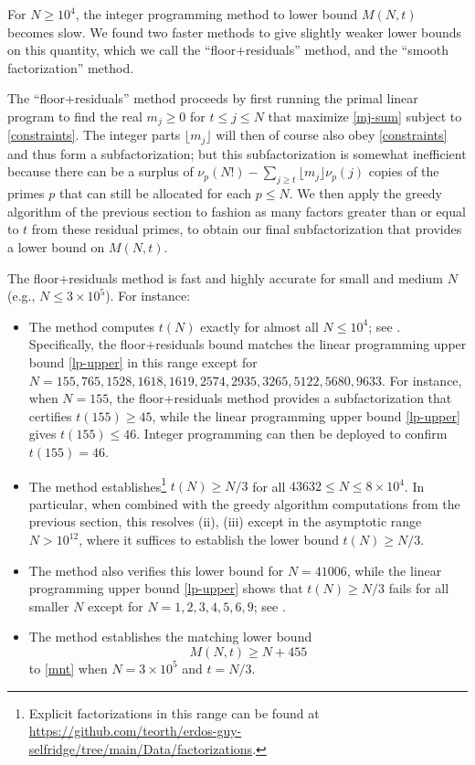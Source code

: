 \documentclass[12pt,a4paper,reqno]{amsart}
\numberwithin{equation}{section}
\theoremstyle{plain}
\theoremstyle{definition}
\begin{document}
For $N \geq 10^4$, the integer programming method to lower bound $M(N,t)$ becomes slow.  We found two faster methods to give slightly weaker lower bounds on this quantity, which we call the ``floor+residuals'' method, and the ``smooth factorization'' method.

The ``floor+residuals'' method proceeds by first running the primal linear program to find the real $m_j \geq 0$ for $t \leq j \leq N$ that maximize \eqref{mj-sum} subject to \eqref{constraints}.  The integer parts $\lfloor m_j \rfloor$ will then of course also obey \eqref{constraints} and thus form a subfactorization; but this subfactorization is somewhat inefficient because there can be a surplus of $\nu_p(N!) - \sum_{j \geq t} \lfloor m_j \rfloor \nu_p(j)$ copies of the primes $p$ that can still be allocated for each $p \leq N$.  We then apply the greedy algorithm of the previous section to fashion as many factors greater than or equal to $t$ from these residual primes, to obtain our final subfactorization that provides a lower bound on $M(N,t)$.

The floor+residuals method is fast and highly accurate for small and medium $N$ (e.g., $N \leq 3 \times 10^5$).  For instance:
\begin{itemize}
  \item The method computes $t(N)$ exactly for almost all $N \leq 10^4$; see .  Specifically, the floor+residuals bound matches the linear programming upper bound \eqref{lp-upper} in this range except for $N=155,765,1528,1618,1619,2574,2935,3265,5122,5680,9633$.  For instance, when $N=155$, the floor+residuals method provides a subfactorization that certifies $t(155) \geq 45$, while the linear programming upper bound \eqref{lp-upper} gives $t(155) \leq 46$.  Integer programming can then be deployed to confirm $t(155)=46$.
  \item The method establishes\footnote{Explicit factorizations in this range can be found at \url{https://github.com/teorth/erdos-guy-selfridge/tree/main/Data/factorizations}.} $t(N) \geq N/3$ for all $43632 \leq N \leq 8 \times 10^4$. 
  In particular, when combined with the greedy algorithm computations from the previous section, this resolves (ii), (iii) except in the asymptotic range $N > 10^{12}$, where it suffices to establish the lower bound $t(N) \geq N/3$.
  \item The method also verifies this lower bound for $N=41006$, while the linear programming upper bound \eqref{lp-upper} shows that $t(N) \geq N/3$ fails for all smaller $N$ except for $N=1,2,3,4,5,6,9$; see .
  \item The method establishes the matching lower bound
\begin{equation}\label{mnt-lower}
M(N,t) \geq N + 455
\end{equation}
to \eqref{mnt} when $N = 3 \times 10^5$ and $t=N/3$.
\end{itemize}
\end{document}
